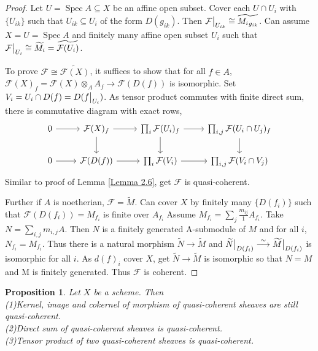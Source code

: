 \documentclass{ctexart}
\newtheorem{proposition}{Proposition}[section]
\newcommand{\spec}{\operatorname{Spec}}
\begin{document}
\begin{proof}
    Let $U = \spec A \subseteq X$ be an affine open subset.
    Cover each $U \cap U_{i}$ with $\{U_{ik}\}$ such that $U_{ik} \subseteq U_{i}$ of the form $D(g_{ik})$.
    Then $\mathcal{F}\big{|}_{U_{ik}} \cong \widetilde{{M_{i}}_{g_{ik}}}$.
    Can assume $X = U = \spec A$ and finitely many affine open subset $U_{i}$ such that $\mathcal{F}\big{|}_{U_{i}} \cong \widetilde{M_{i}} = \widetilde{\mathcal{F}(U_{i})}$.
    \par
    To prove $\mathcal{F} \cong \widetilde{\mathcal{F}(X)}$, it suffices to show that for all $f\in A$, $\mathcal{F}(X)_{f} = \mathcal{F}(X) \otimes_{A} A_{f} \longrightarrow \mathcal{F}(D(f))$ is isomorphic.
    Set $V_{i} = U_{i} \cap D(f) = D(f\big{|}_{U_{i}})$.
    As tensor product commutes with finite direct sum, there is commutative diagram with exact rows,
    \begin{equation}
        \begin{tikzcd}
            0 \arrow[r] &
            \mathcal{F}(X)_{f} \arrow[r] \arrow[d] &
            \prod_{i} \mathcal{F}(U_{i})_{f} \arrow[r] \arrow[d] &
            \prod_{i,j} \mathcal{F}(U_{i} \cap U_{j})_{f} \arrow[d] \\
            0 \arrow[r] &
            \mathcal{F}(D(f)) \arrow[r] &
            \prod_{i} \mathcal{F}(V_{i}) \arrow[r] &
            \prod_{i,j} \mathcal{F}(V_{i} \cap V_{j})
        \end{tikzcd}
    \end{equation}
    Similar to proof of Lemma \ref{Lemma 2.6}, get $\mathcal{F}$ is quasi-coherent.
    \par
    Further if $A$ is noetherian, $\mathcal{F} = \widetilde{M}$.
    Can cover $X$ by finitely many $\{D(f_{i})\}$ such that $\mathcal{F}(D(f_{i})) = M_{f_{i}}$ is finite over $A_{f_{i}}$
    Assume $M_{f_{i}} = \sum_{j} \frac{m_{ij}}{1}A_{f_{i}}$.
    Take $N = \sum_{i,j} m_{i,j}A$.
    Then $N$ is a finitely generated A-submodule of $M$ and for all $i$, $N_{f_{i}} = M_{f_{i}}$.
    Thus there is a natural morphism $\widetilde{N} \longrightarrow \widetilde{M}$ and $\widetilde{N}\big{|}_{D(f_{i})} \overset{\sim}{\longrightarrow} \widetilde{M}\big{|}_{D(f_{i})}$ is isomorphic for all $i$.
    As $d(f)_{i}$ cover $X$, get $\widetilde{N} \longrightarrow \widetilde{M}$ is isomorphic so that $N = M$ and M is finitely generated.
    Thus $\mathcal{F}$ is coherent.
\end{proof}
\begin{proposition}
    Let $X$ be a scheme.
    Then \\
    (1)Kernel, image and cokernel of morphism of quasi-coherent sheaves are still quasi-coherent. \\
    (2)Direct sum of quasi-coherent sheaves is quasi-coherent. \\
    (3)Tensor product of two quasi-coherent sheaves is quasi-coherent.
    \label{Proposition 1.7}
\end{proposition}
\end{document}
